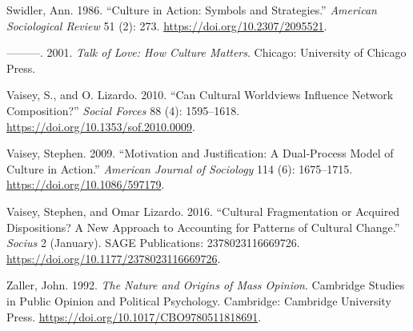 \documentclass[12pt,]{article}
\begin{document}
\leavevmode\hypertarget{ref-swidler1986}{}%
Swidler, Ann. 1986. ``Culture in Action: Symbols and Strategies.'' \emph{American Sociological Review} 51 (2): 273. \url{https://doi.org/10.2307/2095521}.

\leavevmode\hypertarget{ref-swidler2001}{}%
---------. 2001. \emph{Talk of Love: How Culture Matters}. Chicago: University of Chicago Press.

\leavevmode\hypertarget{ref-vaisey2010}{}%
Vaisey, S., and O. Lizardo. 2010. ``Can Cultural Worldviews Influence Network Composition?'' \emph{Social Forces} 88 (4): 1595--1618. \url{https://doi.org/10.1353/sof.2010.0009}.

\leavevmode\hypertarget{ref-vaisey2009}{}%
Vaisey, Stephen. 2009. ``Motivation and Justification: A Dual‐Process Model of Culture in Action.'' \emph{American Journal of Sociology} 114 (6): 1675--1715. \url{https://doi.org/10.1086/597179}.

\leavevmode\hypertarget{ref-vaisey2016}{}%
Vaisey, Stephen, and Omar Lizardo. 2016. ``Cultural Fragmentation or Acquired Dispositions? A New Approach to Accounting for Patterns of Cultural Change.'' \emph{Socius} 2 (January). SAGE Publications: 2378023116669726. \url{https://doi.org/10.1177/2378023116669726}.

\leavevmode\hypertarget{ref-zaller1992}{}%
Zaller, John. 1992. \emph{The Nature and Origins of Mass Opinion}. Cambridge Studies in Public Opinion and Political Psychology. Cambridge: Cambridge University Press. \url{https://doi.org/10.1017/CBO9780511818691}.
\end{document}
